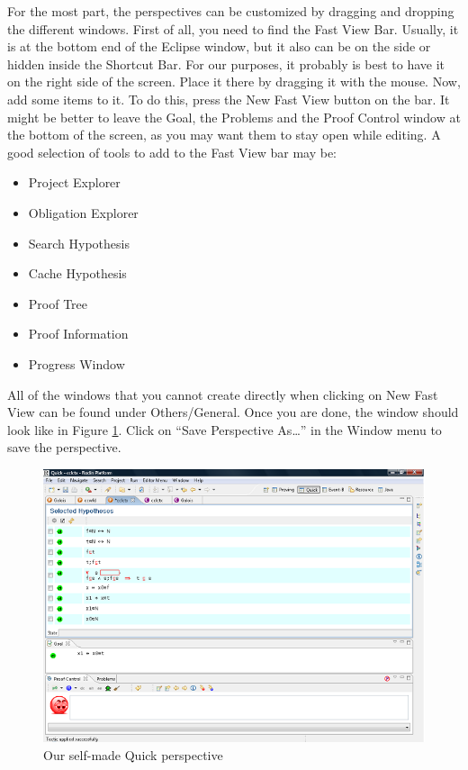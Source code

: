 For the most part, the perspectives can be customized by dragging and dropping the different windows. First of all, you need to find the Fast View Bar. Usually, it is at the bottom end of the Eclipse window, but it also can be on the side or hidden inside the Shortcut Bar. For our purposes, it probably is best to have it on the right side of the screen. Place it there by dragging it with the mouse. Now, add some items to it. To do this, press the \textsf{New Fast View} button on the bar. It might be better to leave the Goal, the Problems and the Proof Control window at the bottom of the screen, as you may want them to stay open while editing. A good selection of tools to add to the Fast View bar may be:

\begin{itemize}
	\item Project Explorer
	\item Obligation Explorer
	\item Search Hypothesis
	\item Cache Hypothesis
	\item Proof Tree
	\item Proof Information
	\item Progress Window
\end{itemize}

All of the windows that you cannot create directly when clicking on \textsf{New Fast View} can be found under \textsf{Others/General}. Once you are done, the window should look like in Figure \ref{fig_ref_10_customizing}. Click on ``Save Perspective As…'' in the Window menu to save the perspective.

\begin{figure}[!ht]
\begin{center}
	\includegraphics{img/reference/ref_10_customizing.png}
	\caption{Our self-made Quick perspective}
	\label{fig_ref_10_customizing}
\end{center}
\end{figure}


